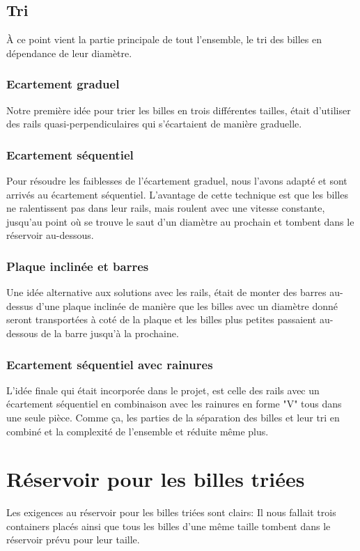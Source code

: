 
\subsection{Tri}
À ce point vient la partie principale de tout l'ensemble, le tri des billes en dépendance de leur diamètre.

\subsubsection{Ecartement graduel}
Notre première idée pour trier les billes en trois différentes tailles, était d'utiliser des rails quasi-perpendiculaires qui s'écartaient de manière graduelle. 


\subsubsection{Ecartement séquentiel}
Pour résoudre les faiblesses de l'écartement graduel, nous l'avons adapté et sont arrivés au écartement séquentiel. L'avantage de cette technique est que les billes ne ralentissent pas dans leur rails, mais roulent avec une vitesse constante, jusqu'au point où se trouve le saut d'un diamètre au prochain et tombent dans le réservoir au-dessous.


\subsubsection{Plaque inclinée et barres}
Une idée alternative aux solutions avec les rails, était de monter des barres au-dessus d'une plaque inclinée de manière que les billes avec un diamètre donné seront transportées à coté de la plaque et les billes plus petites passaient au-dessous de la barre jusqu'à la prochaine.


\subsubsection{Ecartement séquentiel avec rainures}
L'idée finale qui était incorporée dans le projet, est celle des rails avec un écartement séquentiel en combinaison avec les rainures en forme "V" tous dans une seule pièce. Comme ça, les parties de la séparation des billes et leur tri en combiné et la complexité de l'ensemble et réduite même plus.

\section{Réservoir pour les billes triées}
Les exigences au réservoir pour les billes triées sont clairs: Il nous fallait trois containers placés ainsi que tous les billes d'une même taille tombent dans le réservoir prévu pour leur taille.

